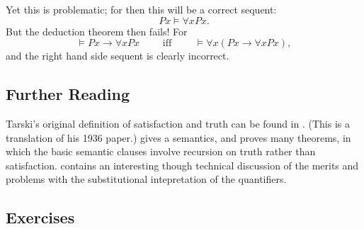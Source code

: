 Yet this is problematic; for then this will be a correct sequent: \begin{equation*}
	Px \vDash \forall x Px.
\end{equation*}
But the deduction theorem then fails! For \begin{equation*}
	\vDash Px\to \forall x Px \qquad\text{ iff }\qquad \vDash\forall x (Px \to \forall x Px),
 \end{equation*} and the right hand side sequent is clearly incorrect.

{\small
\subsection*{Further Reading}

 Tarski's original definition of satisfaction and truth can be found in \citet{tarcontrf}. (This is a translation of his 1936 paper.) \citet[\S\S 3.4--3.6]{bosintlo}  gives a semantics, and proves many theorems, in which the basic semantic clauses involve recursion on truth rather than satisfaction.  \citet{kriisthp} contains an interesting though technical discussion of the merits and problems with the substitutional intepretation of the quantifiers.



\subsection*{Exercises} \label{ex:l2}


}
